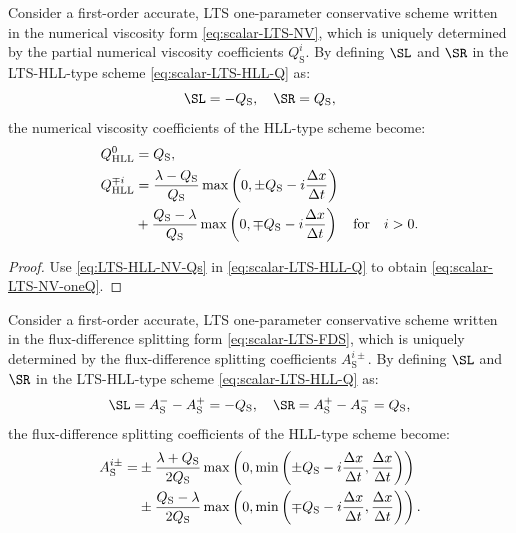 \begin{proposition}\label{prop:LTS-HLL-NV-Qs}
Consider a first-order accurate, LTS one-parameter conservative scheme written in the numerical viscosity form \eqref{eq:scalar-LTS-NV}, which is uniquely determined by the partial numerical viscosity coefficients $ Q_\text{S}^i $. By defining $ \SL $ and $ \SR $ in the LTS-HLL-type scheme \eqref{eq:scalar-LTS-HLL-Q} as:
\begin{equation} \label{eq:LTS-HLL-NV-Qs}
\SL = -Q_\text{S}, \quad \SR = Q_\text{S},
\end{equation}
the numerical viscosity coefficients of the HLL-type scheme become:
\begin{subequations} \label{eq:scalar-LTS-NV-oneQ}
\begin{align}
Q_\text{HLL}^0 & = Q_\text{S}, \\
Q_\text{HLL}^{\mp i} & = \frac{\lambda - Q_\text{S}}{Q_\text{S}} \max \left( 0, \pm Q_\text{S} - i \frac{\Delta x}{\Delta t} \right) \notag \\
& +\frac{Q_\text{S} - \lambda}{Q_\text{S}} \max \left( 0, \mp Q_\text{S} - i \frac{\Delta x}{\Delta t} \right) \quad \text{for}\quad i>0. 
\end{align} 
\end{subequations}
\end{proposition}

\begin{proof}
Use \eqref{eq:LTS-HLL-NV-Qs} in \eqref{eq:scalar-LTS-HLL-Q} to obtain \eqref{eq:scalar-LTS-NV-oneQ}.
\end{proof}

\begin{proposition}\label{prop:LTS-HLL-FDS-As}
Consider a first-order accurate, LTS one-parameter conservative scheme written in the flux-difference splitting form \eqref{eq:scalar-LTS-FDS}, which is uniquely determined by the flux-difference splitting coefficients $ A_\text{S}^{i\pm} $. By defining $ \SL $ and $ \SR $ in the LTS-HLL-type scheme \eqref{eq:scalar-LTS-HLL-Q} as:
\begin{equation} \label{eq:LTS-HLL-FDS-As}
\SL = A_\text{S}^- - A_\text{S}^+ = - Q_\text{S}, \quad \SR = A_\text{S}^+ - A_\text{S}^- = Q_\text{S},
\end{equation}
the flux-difference splitting coefficients of the HLL-type scheme become:
\begin{align} \label{eq:scalar-LTS-FDS-oneA}
A_\text{S}^{i\pm} = & \pm \frac{\lambda + Q_\text{S}}{2 Q_\text{S}} \max \left( 0, \min \left( \pm Q_\text{S} - i \frac{\Delta x}{\Delta t}, \frac{\Delta x}{\Delta t} \right) \right) \notag \\
& \pm \frac{Q_\text{S} - \lambda}{2 Q_\text{S}} \max \left( 0, \min \left( \mp Q_\text{S} - i \frac{\Delta x}{\Delta t}, \frac{\Delta x}{\Delta t} \right) \right). 
\end{align}
\end{proposition}

